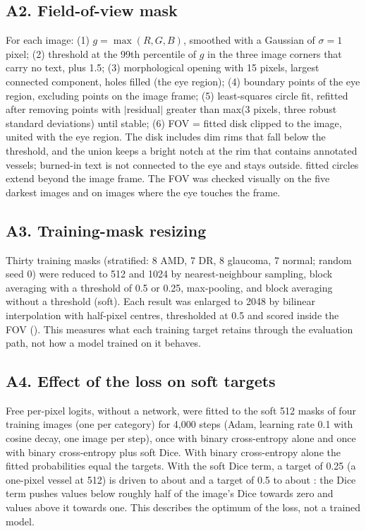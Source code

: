 \subsection*{A2. Field-of-view mask}
For each image: (1) $g = \max(R, G, B)$, smoothed with a Gaussian of $\sigma = 1$ pixel; (2) threshold at the 99th
percentile of $g$ in the three image corners that carry no text, plus 1.5; (3) morphological opening with 15 pixels,
largest connected component, holes filled (the eye region); (4) boundary points of the eye region, excluding points on
the image frame; (5) least-squares circle fit, refitted after removing points with $\lvert$residual$\rvert$ greater than
max(3 pixels, three robust standard deviations) until stable; (6) FOV = fitted disk clipped to the image, united with the
eye region. The disk includes dim rims that fall below the threshold, and the union keeps a bright notch at the rim that
contains annotated vessels; burned-in text is not connected to the eye and stays outside. \NFOVTouchFrame{} fitted circles
extend beyond the image frame. The FOV was checked visually on the five darkest images and on images where the eye
touches the frame.

\subsection*{A3. Training-mask resizing}
Thirty training masks (stratified: 8 AMD, 7 DR, 8 glaucoma, 7 normal; random seed 0) were reduced to 512 and 1024 by
nearest-neighbour sampling, block averaging with a threshold of 0.5 or 0.25, max-pooling, and block averaging without a
threshold (soft). Each result was enlarged to 2048 by bilinear interpolation with half-pixel centres, thresholded at 0.5
and scored inside the FOV (). This measures what each training target retains through the evaluation
path, not how a model trained on it behaves.

\subsection*{A4. Effect of the loss on soft targets}
Free per-pixel logits, without a network, were fitted to the soft 512 masks of four training images (one per category)
for 4,000 steps (Adam, learning rate 0.1 with cosine decay, one image per step), once with binary cross-entropy alone and
once with binary cross-entropy plus soft Dice. With binary cross-entropy alone the fitted probabilities equal the targets.
With the soft Dice term, a target of 0.25 (a one-pixel vessel at 512) is driven to about \LossOptQuarter{} and a target of
0.5 to about \LossOptHalf{}: the Dice term pushes values below roughly half of the image's Dice towards zero and values
above it towards one. This describes the optimum of the loss, not a trained model.

